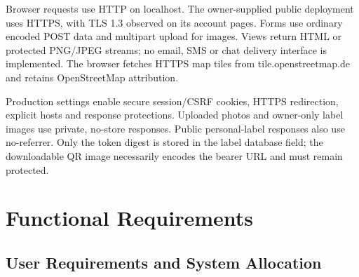 \documentclass[12pt,a4paper,oneside]{report}
\begin{document}
Browser requests use HTTP on localhost. The owner-supplied public deployment uses HTTPS, with TLS 1.3 observed on its account pages. Forms use ordinary encoded POST data and multipart upload for images. Views return HTML or protected PNG/JPEG streams; no email, SMS or chat delivery interface is implemented. The browser fetches HTTPS map tiles from tile.openstreetmap.de and retains OpenStreetMap attribution.

Production settings enable secure session/CSRF cookies, HTTPS redirection, explicit hosts and response protections. Uploaded photos and owner-only label images use private, no-store responses. Public personal-label responses also use no-referrer. Only the token digest is stored in the label database field; the downloadable QR image necessarily encodes the bearer URL and must remain protected.


\section{Functional Requirements}


\subsection{User Requirements and System Allocation}
\end{document}
